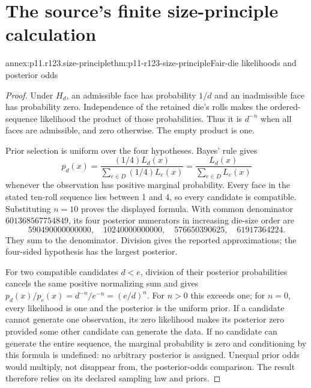 \section{The source's finite size-principle calculation}
\label{sec:p11-annex-rationality-12-3}

\begin{annexitem}{annex:p11.r123.size-principle}{thm:p11-r123-size-principle}{Fair-die likelihoods and posterior odds}
\begin{proof}
Under \(H_d\), an admissible face has probability \(1/d\) and
an inadmissible face has probability zero. Independence of the retained
die's rolls makes the ordered-sequence likelihood the product of those
probabilities. Thus it is \(d^{-n}\) when all faces are admissible,
and zero otherwise. The empty product is one.

Prior selection is uniform over the four hypotheses. Bayes' rule gives
\[
 p_d(x)=\frac{(1/4)L_d(x)}{\sum_{e\in D}(1/4)L_e(x)}
        =\frac{L_d(x)}{\sum_{e\in D}L_e(x)}
\]
whenever the observation has positive marginal probability. Every face
in the stated ten-roll sequence lies between 1 and 4, so every candidate
is compatible. Substituting \(n=10\) proves the displayed formula.
With common denominator \(601368567754849\), its four posterior
numerators in increasing die-size order are
\[
590490000000000,\quad10240000000000,\quad
576650390625,\quad61917364224.
\]
They sum to the denominator. Division gives the reported approximations;
the four-sided hypothesis has the largest posterior.

For two compatible candidates \(d<e\), division of their posterior
probabilities cancels the same positive normalizing sum and gives
\(p_d(x)/p_e(x)=d^{-n}/e^{-n}=(e/d)^n\).
For \(n>0\) this exceeds one; for \(n=0\), every likelihood is
one and the posterior is the uniform prior. If a candidate cannot
generate one observation, its zero likelihood makes its posterior zero
provided some other candidate can generate the data. If no candidate
can generate the entire sequence, the marginal probability is zero and
conditioning by this formula is undefined: no arbitrary posterior is
assigned. Unequal prior odds would multiply, not disappear from, the
posterior-odds comparison. The result therefore relies on its declared
sampling law and priors.
\end{proof}
\end{annexitem}

